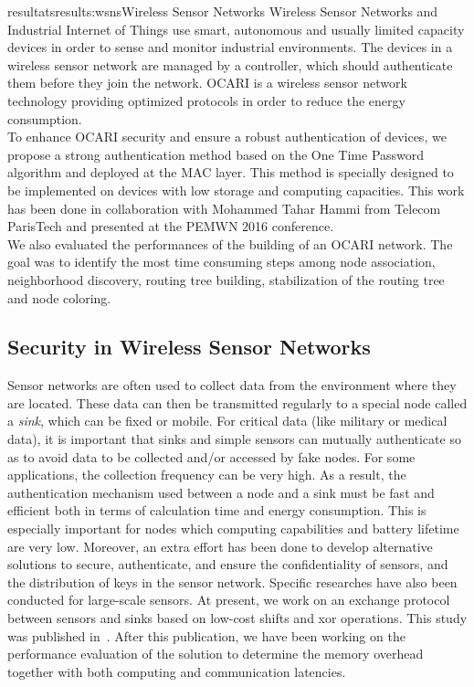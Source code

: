 \documentclass{ra2016}
\begin{document}
\begin{module}{resultats}{results:wsns}{Wireless Sensor Networks}
Wireless Sensor Networks and Industrial Internet
of Things use smart, autonomous and usually limited capacity
devices in order to sense and monitor industrial environments.
The devices in a wireless sensor network are managed by a
controller, which should authenticate them before they join
the network. OCARI is a wireless sensor network technology
providing optimized protocols in order to reduce the energy
consumption.\\ 

To enhance OCARI security and ensure a robust
authentication of devices, we propose a strong authentication
method based on the One Time Password algorithm and deployed
at the MAC layer. This method is specially designed to
be implemented on devices with low storage and computing
capacities.
This work has been done in collaboration with Mohammed Tahar Hammi from Telecom ParisTech and presented at the PEMWN 2016 conference.\\

We also evaluated the performances of the building of an OCARI network. The goal was to identify the most time consuming steps among node association, neighborhood discovery, routing tree building, stabilization of the routing tree and node coloring.\\

\subsection{Security in Wireless Sensor Networks}

\begin{participants}
\end{participants}

Sensor networks are often used to collect data from the environment where they are located. These data can then be transmitted regularly to a special node called a {\em sink}, which can be fixed or mobile. For critical data (like military or medical data), it is important that sinks and simple sensors can mutually authenticate so as to avoid data to be collected and/or accessed by fake nodes.
For some applications, the collection frequency can be very high. As a result, the authentication mechanism used between a node and a sink must be fast and efficient both in terms of calculation time and energy consumption. This is especially important for nodes which computing capabilities and battery lifetime are very low. Moreover, an extra effort has been done to develop alternative solutions to secure, authenticate, and ensure the confidentiality of sensors, and the distribution of keys in the sensor network. Specific researches have also been conducted for large-scale sensors. At present, we work on an exchange protocol between sensors and sinks based on low-cost shifts and xor operations. This study was published in~\cite{boumerdassi:hal-01251917}. After this publication, we have been working on the performance evaluation of the solution to determine the memory overhead together with both computing and communication latencies.


\end{module}
\end{document}

